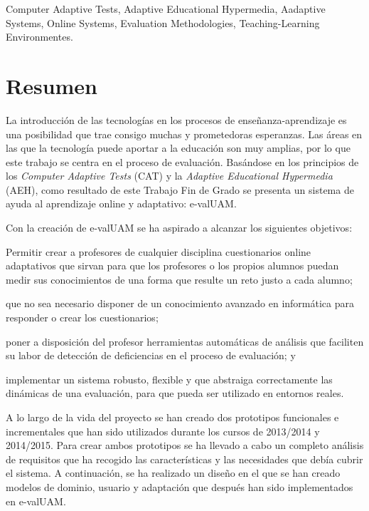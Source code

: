 \begin{keywordsEn}
Computer Adaptive Tests, Adaptive Educational Hypermedia, Aadaptive Systems, Online Systems, Evaluation Methodologies, Teaching-Learning Environmentes.
\end{keywordsEn}

\chapter*{Resumen}

\begin{abstractEs}
La introducción de las tecnologías en los procesos de enseñanza-aprendizaje es una posibilidad que trae consigo muchas y prometedoras esperanzas. Las áreas en las que la tecnología puede aportar a la educación son muy amplias, por lo que este trabajo se centra en el proceso de evaluación. Basándose en los principios de los \textit{Computer Adaptive Tests} (\acrshort{CAT}) y la \textit{Adaptive Educational Hypermedia} (\acrshort{AEH}), como resultado de este Trabajo Fin de Grado se presenta un sistema de ayuda al aprendizaje online y adaptativo: e-valUAM.

Con la creación de e-valUAM se ha aspirado a alcanzar los siguientes objetivos: 
\begin{enumerate*}[label=\alph*\upshape)]
\item Permitir crear a profesores de cualquier disciplina cuestionarios online adaptativos que sirvan para que los profesores o los propios alumnos puedan medir sus conocimientos de una forma que resulte un reto justo a cada alumno; 
\item que no sea necesario disponer de un conocimiento avanzado en informática para responder o crear los cuestionarios;
\item poner a disposición del profesor herramientas automáticas de análisis que faciliten su labor de detección de deficiencias en el proceso de evaluación; y 
\item implementar un sistema robusto, flexible y que abstraiga correctamente las dinámicas de una evaluación, para que pueda ser utilizado en entornos reales.
\end{enumerate*}

A lo largo de la vida del proyecto se han creado dos prototipos funcionales e incrementales que han sido utilizados durante los cursos de 2013/2014 y 2014/2015. Para crear ambos prototipos se ha llevado a cabo un completo análisis de requisitos que ha recogido las características y las necesidades que debía cubrir el sistema. A continuación, se ha realizado un diseño en el que se han creado modelos de dominio, usuario y adaptación que después han sido implementados en e-valUAM. 


\end{abstractEs}

